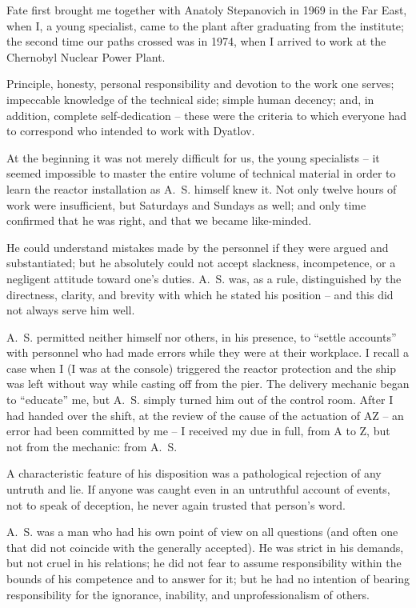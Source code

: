 \documentclass[openright]{bookest}
\begin{document}
Fate first brought me together with Anatoly Stepanovich in 1969 in the Far East, when I, a young specialist, came to the plant after graduating from the institute; the second time our paths crossed was in 1974, when I arrived to work at the Chernobyl Nuclear Power Plant.

Principle, honesty, personal responsibility and devotion to the work one serves; impeccable knowledge of the technical side; simple human decency; and, in addition, complete self-dedication -- these were the criteria to which everyone had to correspond who intended to work with Dyatlov.

At the beginning it was not merely difficult for us, the young specialists -- it seemed impossible to master the entire volume of technical material in order to learn the reactor installation as A.~S. himself knew it. Not only twelve hours of work were insufficient, but Saturdays and Sundays as well; and only time confirmed that he was right, and that we became like-minded.

He could understand mistakes made by the personnel if they were argued and substantiated; but he absolutely could not accept slackness, incompetence, or a negligent attitude toward one's duties. A.~S. was, as a rule, distinguished by the directness, clarity, and brevity with which he stated his position -- and this did not always serve him well.

A.~S. permitted neither himself nor others, in his presence, to ``settle accounts'' with personnel who had made errors while they were at their workplace. I recall a case when I (I was at the console) triggered the reactor protection and the ship was left without way while casting off from the pier. The delivery mechanic began to ``educate'' me, but A.~S. simply turned him out of the control room. After I had handed over the shift, at the review of the cause of the actuation of AZ -- an error had been committed by me -- I received my due in full, from A to Z, but not from the mechanic: from A.~S.

A characteristic feature of his disposition was a pathological rejection of any untruth and lie. If anyone was caught even in an untruthful account of events, not to speak of deception, he never again trusted that person's word.

A.~S. was a man who had his own point of view on all questions (and often one that did not coincide with the generally accepted). He was strict in his demands, but not cruel in his relations; he did not fear to assume responsibility within the bounds of his competence and to answer for it; but he had no intention of bearing responsibility for the ignorance, inability, and unprofessionalism of others.
\end{document}

